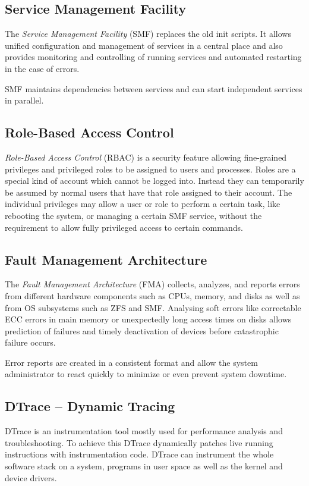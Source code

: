 \documentclass[11pt,foldmark,notumble]{leaflet}
\begin{document}
\subsection{Service Management Facility}
The \emph{Service Management Facility} (SMF) replaces the old init
scripts. It allows unified configuration and management of services
in a central place and also provides monitoring and controlling of
running services and automated restarting in the case of errors.

SMF maintains dependencies between services and can start independent
services in parallel.

\subsection{Role-Based Access Control}
\emph{Role-Based Access Control} (RBAC) is a security feature allowing
fine-grained privileges and privileged roles to be assigned to users
and processes. Roles are a special kind of account which cannot be
logged into. Instead they can temporarily be assumed by normal users
that have that role assigned to their account. The individual
privileges may allow a user or role to perform a certain task, like
rebooting the system, or managing a certain SMF service, without the
requirement to allow fully privileged access to certain commands.

\subsection{Fault Management Architecture}
The \emph{Fault Management Architecture} (FMA) collects, analyzes, and
reports errors from different hardware components such as CPUs,
memory, and disks as well as from OS subsystems such as ZFS and SMF.
Analysing soft errors like correctable ECC errors in main memory or
unexpectedly long access times on disks allows prediction of failures
and timely deactivation of devices before catastrophic failure occurs.

Error reports are created in a consistent format and allow the system
administrator to react quickly to minimize or even prevent system
downtime.

\subsection{DTrace -- Dynamic Tracing}
DTrace is an instrumentation tool mostly used for performance analysis
and troubleshooting. To achieve this DTrace dynamically patches live
running instructions with instrumentation code. DTrace can instrument
the whole software stack on a system, programs in user space as well
as the kernel and device drivers.
\end{document}
